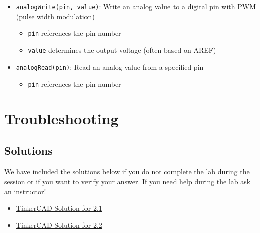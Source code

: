 \documentclass{article}
\begin{document}
\begin{itemize}
    \item \texttt{analogWrite(pin, value)}: Write an analog value to a digital pin with PWM (pulse width modulation)
    \begin{itemize}
        \item \texttt{pin} references the pin number
        \item \texttt{value} determines the output voltage (often based on AREF)
    \end{itemize}
    \item \texttt{analogRead(pin)}: Read an analog value from a specified pin
    \begin{itemize}
        \item \texttt{pin} references the pin number
    \end{itemize}
\end{itemize}


\section{Troubleshooting}
\subsection{Solutions}
We have included the solutions below if you do not complete the lab during the session or if you want to verify your answer. If you need help during the lab ask an instructor!
\begin{itemize}
    \item \href{https://www.tinkercad.com/things/bUqJOIWlYAN}{TinkerCAD Solution for 2.1}
    \item \href{https://www.tinkercad.com/things/1ioFvB93kYq}{TinkerCAD Solution for 2.2}
\end{itemize}
\end{document}
